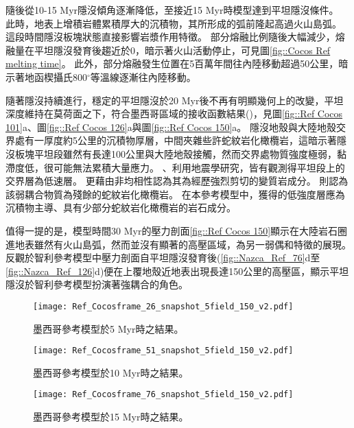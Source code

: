 隨後從10-15 Myr隱沒傾角逐漸降低，至接近15 Myr時模型達到平坦隱沒條件。
此時，地表上增積岩體累積厚大的沉積物，其所形成的弧前隆起高過火山島弧。
這段時間隱沒板塊狀態直接影響岩漿作用特徵。
部分熔融比例隨後大幅減少，熔融量在平坦隱沒發育後趨近於0，暗示著火山活動停止，可見圖\ref{fig::Cocos Ref melting time}。
此外，部分熔融發生位置在5百萬年間往內陸移動超過50公里，暗示著地函楔攝氏800$^{\circ}$等溫線逐漸往內陸移動。

隨著隱沒持續進行，穩定的平坦隱沒於20 Myr後不再有明顯幾何上的改變，平坦深度維持在莫荷面之下，符合墨西哥區域的接收函數結果(\citealp{PerezCampos2008})，見圖\ref{fig::Ref Cocos 101}a、圖\ref{fig::Ref Cocos 126}a與圖\ref{fig::Ref Cocos 150}a。
隱沒地殼與大陸地殼交界處有一厚度約5公里的沉積物厚層，中間夾雜些許蛇紋岩化橄欖岩，這暗示著隱沒板塊平坦段雖然有長達100公里與大陸地殼接觸，然而交界處物質強度極弱，黏滯度低，很可能無法累積大量應力。
\citealp{Song2009}、\citealp{Song2012SC}利用地震學研究，皆有觀測得平坦段上的交界層為低速層。
\citealp{Song2012SC}更藉由非均相性認為其為經歷強烈剪切的變質岩成分。
\citealp{Manea2017}則認為該弱耦合物質為殘餘的蛇紋岩化橄欖岩。
在本參考模型中，獲得的低強度層應為沉積物主導、具有少部分蛇紋岩化橄欖岩的岩石成分。

值得一提的是，模型時間30 Myr的壓力剖面\ref{fig::Ref Cocos 150}顯示在大陸岩石圈進地表雖然有火山島弧，然而並沒有顯著的高壓區域，為另一弱偶和特徵的展現。
反觀於智利參考模型中壓力剖面自平坦隱沒發育後(\ref{fig::Nazca_Ref_76}d至\ref{fig::Nazca_Ref_126}d)便在上覆地殼近地表出現長達150公里的高壓區，顯示平坦隱沒於智利參考模型扮演著強耦合的角色。

\begin{figure*}[htp]
    \centering
    \texttt{[image: Ref\_Cocosframe\_26\_snapshot\_5field\_150\_v2.pdf]}
    \caption[墨西哥參考模型於5 Myr時之結果]{墨西哥參考模型於5 Myr時之結果。}
    \label{fig::Ref Cocos 26}
\end{figure*}

\begin{figure*}[htp]
    \centering
    \texttt{[image: Ref\_Cocosframe\_51\_snapshot\_5field\_150\_v2.pdf]}
    \caption[墨西哥參考模型於10 Myr時之結果]{墨西哥參考模型於10 Myr時之結果。}
    \label{fig::Ref Cocos 51}
\end{figure*}

\begin{figure*}[htp]
    \centering
    \texttt{[image: Ref\_Cocosframe\_76\_snapshot\_5field\_150\_v2.pdf]}
    \caption[墨西哥參考模型於15 Myr時之結果]{墨西哥參考模型於15 Myr時之結果。}
    \label{fig::Ref Cocos 76}
\end{figure*}

